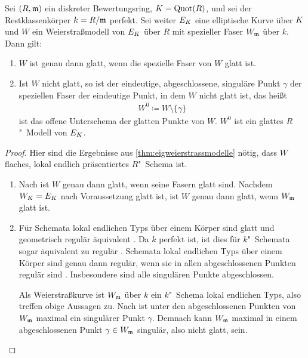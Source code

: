 \begin{Satz}\label{thm:weierstrassglatt}
  Sei $(R,\mathfrak{m})$ ein diskreter Bewertungsring,
  ${K=\operatorname{Quot}(R)}$,
  und sei der Restklassenkörper ${k=R/\mathfrak{m}}$ perfekt.
  Sei weiter $E_{K}$ eine elliptische Kurve über $K$ und
  $W$ ein Weierstraßmodell von $E_{K}$ über $R$
  mit spezieller Faser $W_{\mathfrak{m}}$ über $k$.
  Dann gilt:
  \begin{enumerate}[label=(\alph*)]
  \item $W$ ist genau dann glatt, wenn die spezielle Faser von $W$ glatt
    ist.
  \item Ist $W$ nicht glatt, so ist der eindeutige, abgeschlossene,
    singuläre Punkt $\gamma$ der speziellen Faser der eindeutige
    Punkt, in dem $W$ nicht glatt ist, das heißt
    \begin{gather*}
      W^0\coloneqq W\setminus \{\gamma\}
    \end{gather*}
    ist das offene Unterschema der glatten Punkte von $W$.
    $W^0$ ist ein glattes $R$"~Modell von $E_{K}$.
  \end{enumerate}
  \begin{proof}
    Hier sind die Ergebnisse aus \ref{thm:eigweierstrassmodelle}
    nötig, dass $W$ flaches, lokal endlich präsentiertes
    $R$"~Schema ist.
    \begin{enumerate}[resume*,start=1]
    \item 
      Nach \cite[Proposition~8.5/17]{bosch} ist $W$ genau dann
      glatt, wenn seine Fasern glatt sind.
      Nachdem $W_{K}=E_{K}$ nach Voraussetzung glatt ist, ist $W$ genau
      dann glatt, wenn $W_{\mathfrak{m}}$ glatt ist.
    \item Für Schemata lokal endlichen Typs über einem Körper sind
      glatt und geometrisch regulär äquivalent
      \cite[Corollary~6.32]{wedhorn}.
      Da $k$ perfekt ist, ist dies für $k$"~Schemata sogar
      äquivalent zu regulär
      \cite[Remark~6.33]{wedhorn}.
      Schemata lokal endlichen Typs über einem Körper sind genau dann
      regulär, wenn sie in allen abgeschlossenen Punkten regulär sind
      \cite[Remark~6.25~(3)]{wedhorn}. Insbesondere sind alle
      singulären Punkte abgeschlossen.

      Als Weierstraßkurve ist $W_{\mathfrak{m}}$ über $k$ ein $k$"~Schema
      lokal endlichen Typs, also treffen obige Aussagen zu.
      Nach \cite[Proposition~III.1.4]{silverman} ist unter den
      abgeschlossenen Punkten von $W_{\mathfrak{m}}$ maximal ein singulärer Punkt
      $\gamma$. Demnach kann $W_{\mathfrak{m}}$ maximal in einem abgeschlossenen
      Punkt $\gamma\in W_{\mathfrak{m}}$ singulär, also nicht glatt, sein.


\end{enumerate}
\end{proof}
\end{Satz}
